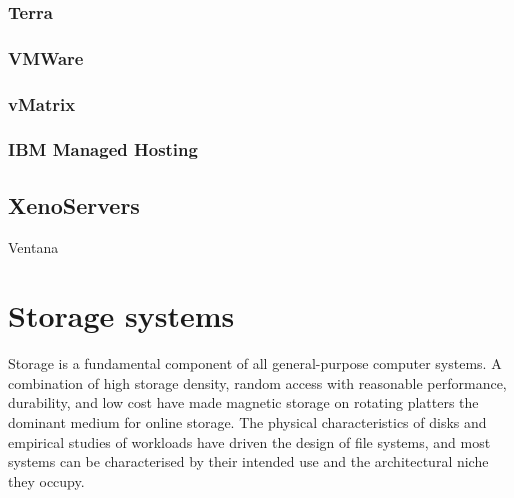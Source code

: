 \subsubsection{Terra}
\cite{garfinkel}
\subsubsection{VMWare}
\subsubsection{vMatrix}
\subsubsection{IBM Managed Hosting}

\subsection{XenoServers}
\cite{kotsovinos}

Ventana \cite{pfaff}

\section{Storage systems}



Storage is a fundamental component of all general-purpose computer systems. A combination of high storage density, random access with reasonable performance, durability, and low cost have made magnetic storage on rotating platters the dominant medium for online storage. The physical characteristics of disks and empirical studies of workloads have driven the design of file systems, and most systems can be characterised by their intended use and the architectural niche they occupy.

% 

